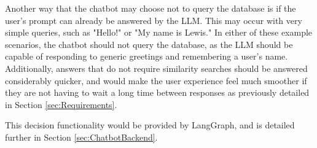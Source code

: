 \para Another way that the chatbot may choose not to query the database is if the user's prompt can already be answered by the LLM. This may 
occur with very simple queries, such as "Hello!" or "My name is Lewis." In either of these example scenarios, the chatbot should not query the 
database, as the LLM should be capable of responding to generic greetings and remembering a user's name. Additionally, answers that do not 
require similarity searches should be answered considerably quicker, and would make the user experience feel much smoother if they are not 
having to wait a long time between responses as previously detailed in Section \ref{sec:Requirements}. 

\para This decision functionality would be provided by LangGraph, and is detailed 
further in Section \ref{sec:ChatbotBackend}.




